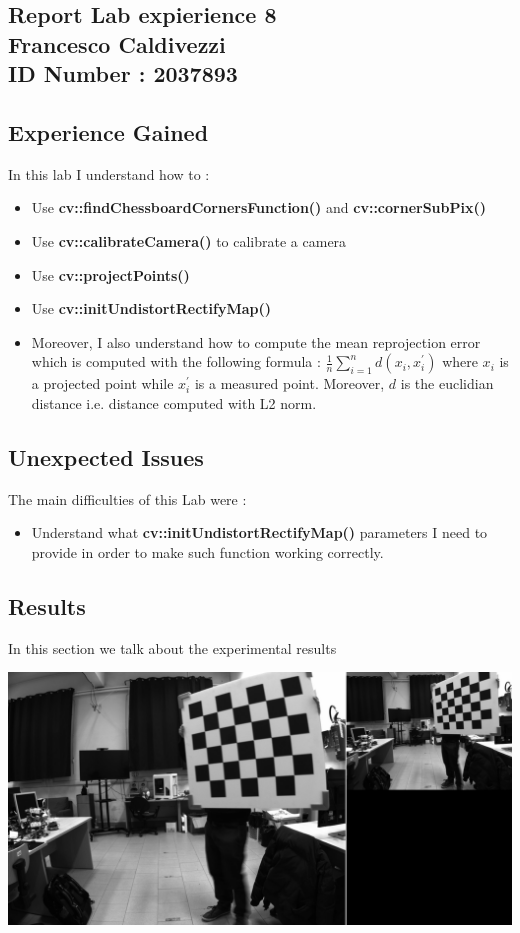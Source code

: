 \documentclass{article}
\begin{document}
\begin{flushleft}
\section*{Report Lab expierience 8 \\ Francesco Caldivezzi \\ ID Number : 2037893}

\subsection*{Experience Gained}
In this lab I understand how to :
\begin{itemize}
  \item Use \textbf{cv::findChessboardCornersFunction()} and \textbf{cv::cornerSubPix()}
  \item Use \textbf{cv::calibrateCamera()} to calibrate a camera
  \item Use \textbf{cv::projectPoints()}
  \item Use \textbf{cv::initUndistortRectifyMap()}
  \item Moreover, I also understand how to compute the mean reprojection error which is computed with the following formula : \( \frac{1}{n}\sum\limits_{i=1}^n d( x_i,x_i^{'}) \) where \(  x_i\) is a projected point while \(  x_i^{'} \) is a measured point. Moreover, \(d\) is the euclidian distance i.e. distance computed with L2 norm.
\end{itemize}


\newpage
\subsection*{Unexpected Issues}
The main difficulties of this Lab were :
\begin{itemize}
\item Understand what \textbf{cv::initUndistortRectifyMap()} parameters I need to provide in order to make such function working correctly.
\end{itemize}
\newpage
\subsection*{Results}
In this section we talk about the experimental results

\includegraphics[scale = 0.15]{images/image.png}\\
\end{flushleft}
\end{document}
